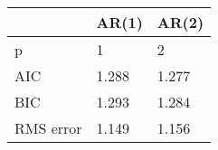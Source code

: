 \begin{tabular}{lll}
\toprule
{} &  AR(1) &  AR(2) \\
\midrule
p  &      1 &      2 \\
AIC       &  1.288 &  1.277 \\
BIC       &  1.293 &  1.284 \\
RMS error &  1.149 &  1.156 \\
\bottomrule
\end{tabular}
